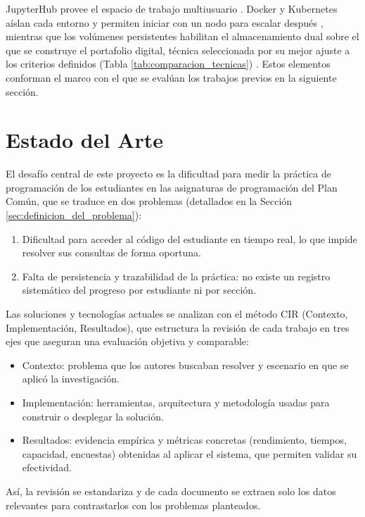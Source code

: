 JupyterHub provee el espacio de trabajo multiusuario \cite{jupyterhub_docs_2024}. Docker y Kubernetes aíslan cada entorno y permiten iniciar con un nodo para escalar después \cite{pahl2017cloud, z2jh_architecture_2024}, mientras que los volúmenes persistentes habilitan el almacenamiento dual \cite{k8s_pv_2024} sobre el que se construye el portafolio digital, técnica seleccionada por su mejor ajuste a los criterios definidos (Tabla \ref{tab:comparacion_tecnicas}) \cite{olstad2025eportfolios, garcia2025portfolios}. Estos elementos conforman el marco con el que se evalúan los trabajos previos en la siguiente sección.


\section{Estado del Arte}
\label{sec:estado_del_arte}
El desafío central de este proyecto es la dificultad para medir la práctica de programación de los estudiantes en las asignaturas de programación del Plan Común, que se traduce en dos problemas (detallados en la Sección \ref{sec:definicion_del_problema}):
\begin{enumerate}
    \item Dificultad para acceder al código del estudiante en tiempo real, lo que impide resolver sus consultas de forma oportuna.
    \item Falta de persistencia y trazabilidad de la práctica: no existe un registro sistemático del progreso por estudiante ni por sección.
\end{enumerate}

Las soluciones y tecnologías actuales se analizan con el método CIR (Contexto, Implementación, Resultados), que estructura la revisión de cada trabajo en tres ejes que aseguran una evaluación objetiva y comparable:
\begin{itemize}
    \item Contexto: problema que los autores buscaban resolver y escenario en que se aplicó la investigación.
    \item Implementación: herramientas, arquitectura y metodología usadas para construir o desplegar la solución.
    \item Resultados: evidencia empírica y métricas concretas (rendimiento, tiempos, capacidad, encuestas) obtenidas al aplicar el sistema, que permiten validar su efectividad.
\end{itemize}

Así, la revisión se estandariza y de cada documento se extraen solo los datos relevantes para contrastarlos con los problemas planteados.

